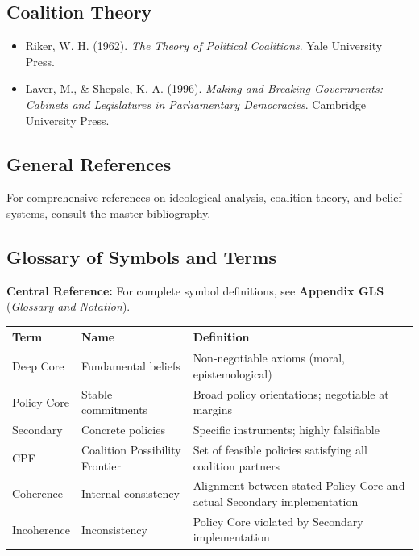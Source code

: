 \subsection{Coalition Theory}

\begin{itemize}[nosep]
\item Riker, W. H. (1962). \textit{The Theory of Political Coalitions}. Yale University Press.

\item Laver, M., \& Shepsle, K. A. (1996). \textit{Making and Breaking Governments: Cabinets and Legislatures in Parliamentary Democracies}. Cambridge University Press.

\end{itemize}

\nocite{bcm_master}

\subsection{General References}

For comprehensive references on ideological analysis, coalition theory, and belief systems, consult the master bibliography.

\subsection{Glossary of Symbols and Terms}

\begin{tcolorbox}[colback=blue!5!white, colframe=blue!75!black]
\textbf{Central Reference:} For complete symbol definitions, see
\textbf{Appendix GLS} (\textit{Glossary and Notation}).
\end{tcolorbox}

\begin{table}[h]
\centering
\small
\renewcommand{\arraystretch}{1.3}
\begin{tabular}{@{}llp{6cm}@{}}
\toprule
\textbf{Term} & \textbf{Name} & \textbf{Definition} \\
\midrule
Deep Core & Fundamental beliefs & Non-negotiable axioms (moral, epistemological) \\
Policy Core & Stable commitments & Broad policy orientations; negotiable at margins \\
Secondary & Concrete policies & Specific instruments; highly falsifiable \\
CPF & Coalition Possibility Frontier & Set of feasible policies satisfying all coalition partners \\
Coherence & Internal consistency & Alignment between stated Policy Core and actual Secondary implementation \\
Incoherence & Inconsistency & Policy Core violated by Secondary implementation \\
\bottomrule
\end{tabular}
\end{table}

